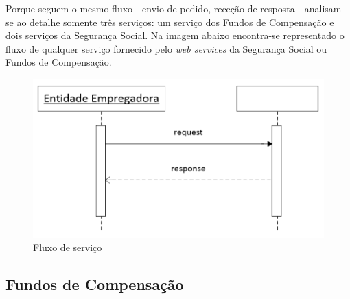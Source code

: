 \documentclass[sigplan]{acmart}
\begin{document}
Porque seguem o mesmo fluxo - envio de pedido, receção de resposta - analisam-se ao detalhe somente três serviços: um serviço dos Fundos de Compensação e dois serviços da Segurança Social. Na imagem abaixo encontra-se representado o fluxo de qualquer serviço fornecido pelo \textit{web services} da Segurança Social ou Fundos de Compensação.
\FloatBarrier
\begin{figure}[htbp]
	\centerline{\includegraphics[width=\linewidth]{figures/fluxo_servicos.png}}
	\caption{Fluxo de serviço}
	\label{fig3}
\end{figure}
\FloatBarrier

\subsection{Fundos de Compensação}
\end{document}

